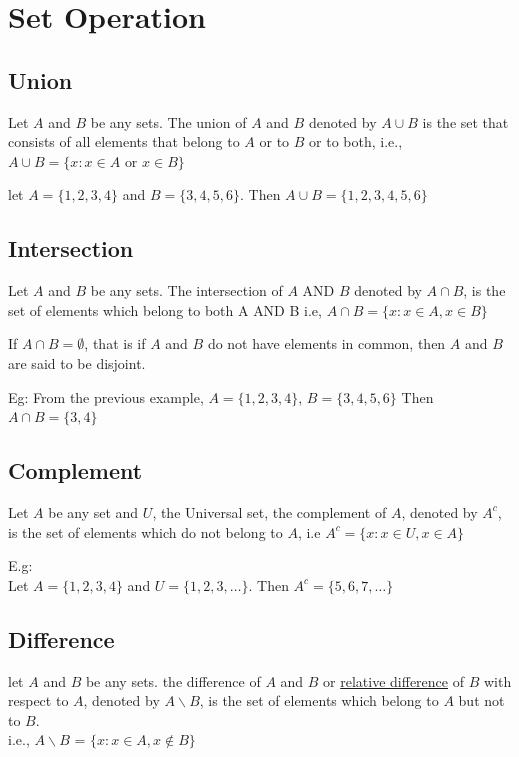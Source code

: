 \section{Set Operation}
\subsection{Union}
\begin{para}
    Let $A$ and $B$ be any sets. The union of $A$ and $B$ denoted by $A \cup B$ is the set that consists of all elements that belong to $A$ or to $B$ or to both, i.e., $A \cup B = \{x:x \in A \text{ or } x \in B\}$
\end{para}
\begin{para}
    let $A = \{1,2,3,4\}$ and $B = \{3,4,5,6\}$. Then $A \cup B = \{1,2,3,4,5,6\}$
\end{para}
\subsection{Intersection}
\begin{para}
    Let $A$ and $B$ be any sets. The intersection of $A$ AND $B$ denoted by $A \cap B$, is the set of elements which belong to both A AND B i.e, $A \cap B = \{x:x \in A, x \in B\}$
\end{para}

\begin{para}
    If $A \cap B = \emptyset$, that is if $A$ and $B$ do not have elements in common, then $A$ and $B$ are said to be disjoint.
\end{para}

\begin{para}
    Eg: From the previous example, $A = \{1,2,3,4\}$, $B = \{3,4,5,6\}$ Then $A \cap B = \{3,4\}$
\end{para}

\subsection{Complement}
\begin{para}
    Let $A$ be any set and $U$, the Universal set, the complement of $A$, denoted by $A^c$, is the set of elements which do not belong to $A$, i.e $A^c = \{x:x \in U, x \in A\}$

    E.g: \\
    Let $A = \{1,2,3,4\}$ and $U = \{1,2,3, \dots\}$. Then $A^c = \{5,6,7,\dots\}$
\end{para}

\subsection{Difference}
\begin{para}
    let $A$ and $B$ be any sets. the difference of $A$ and $B$ or \underline{relative difference} of $B$ with respect to $A$, denoted by $A\backslash B$, is the set of elements which belong to $A$ but not to $B$.\\
    i.e., $A\backslash B$ = $\{x:x \in A, x \notin B\}$
\end{para}


